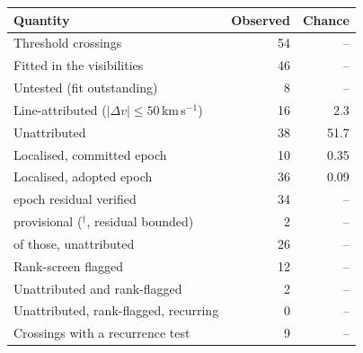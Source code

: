 \begin{tabular}{@{}lrr@{}}
\hline
Quantity & Observed & Chance \\
\hline
Threshold crossings & 54 & -- \\
Fitted in the visibilities & 46 & -- \\
Untested (fit outstanding) & 8 & -- \\
Line-attributed ($|\Delta v|\leq50$\,km\,s$^{-1}$) & 16 & 2.3 \\
Unattributed & 38 & 51.7 \\
Localised, committed epoch & 10 & 0.35 \\
Localised, adopted epoch & 36 & 0.09 \\
\quad epoch residual verified & 34 & -- \\
\quad provisional ($^{\dagger}$, residual bounded) & 2 & -- \\
\quad of those, unattributed & 26 & -- \\
Rank-screen flagged & 12 & -- \\
Unattributed and rank-flagged & 2 & -- \\
Unattributed, rank-flagged, recurring & 0 & -- \\
Crossings with a recurrence test & 9 & -- \\
\hline
\end{tabular}
